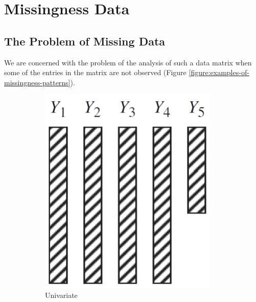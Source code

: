 \chapter{Missingness Data}

\section{The Problem of Missing Data}

We are concerned with the problem of the analysis of such a data matrix when some of the entries in the matrix are not observed (Figure \ref{figure:examples-of-missingness-patterns}).

\begin{figure}[hpt]
	\centering
	\begin{subfigure}{.25\textwidth}
		\centering
		\includegraphics[width=\linewidth]{statistics-applications/figures/univariate-nonresponse.png}
		\caption{Univariate}
	\end{subfigure}
	\quad
	\begin{subfigure}{.25\textwidth}
		\centering

\end{subfigure}
\end{figure}
